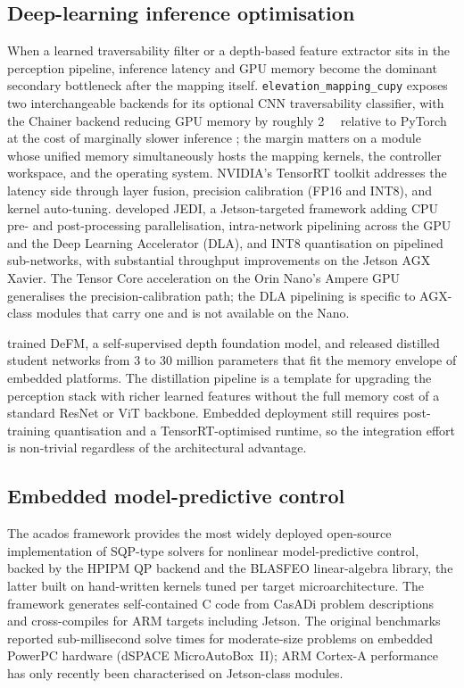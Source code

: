 \documentclass[11pt,a4paper]{article}
\begin{document}
\subsection{Deep-learning inference optimisation}
\label{sec:sq6:inference}

When a learned traversability filter or a depth-based feature extractor sits in the perception pipeline, inference latency and GPU memory become the dominant secondary bottleneck after the mapping itself. \texttt{elevation\_mapping\_cupy} exposes two interchangeable backends for its optional CNN traversability classifier, with the Chainer backend reducing GPU memory by roughly \SI{2}{\giga\byte} relative to PyTorch at the cost of marginally slower inference \citep{mikiElevationMappingLocomotion2022}; the margin matters on a module whose unified memory simultaneously hosts the mapping kernels, the controller workspace, and the operating system. NVIDIA's TensorRT toolkit addresses the latency side through layer fusion, precision calibration (FP16 and INT8), and kernel auto-tuning. \citet{jeong2022jedi} developed JEDI, a Jetson-targeted framework adding CPU pre- and post-processing parallelisation, intra-network pipelining across the GPU and the Deep Learning Accelerator (DLA), and INT8 quantisation on pipelined sub-networks, with substantial throughput improvements on the Jetson AGX Xavier. The Tensor Core acceleration on the Orin Nano's Ampere GPU generalises the precision-calibration path; the DLA pipelining is specific to AGX-class modules that carry one and is not available on the Nano.

\citet{patelDeFMLearningFoundation2026} trained DeFM, a self-supervised depth foundation model, and released distilled student networks from \num{3} to \num{30} million parameters that fit the memory envelope of embedded platforms. The distillation pipeline is a template for upgrading the perception stack with richer learned features without the full memory cost of a standard ResNet or ViT backbone. Embedded deployment still requires post-training quantisation and a TensorRT-optimised runtime, so the integration effort is non-trivial regardless of the architectural advantage.

\subsection{Embedded model-predictive control}
\label{sec:sq6:mpc}

The acados framework \citep{verschueren2022acados} provides the most widely deployed open-source implementation of SQP-type solvers for nonlinear model-predictive control, backed by the HPIPM QP backend and the BLASFEO \citep{frison2018blasfeo} linear-algebra library, the latter built on hand-written kernels tuned per target microarchitecture. The framework generates self-contained C code from CasADi problem descriptions and cross-compiles for ARM targets including Jetson. The original benchmarks reported sub-millisecond solve times for moderate-size problems on embedded PowerPC hardware (dSPACE MicroAutoBox~II); ARM Cortex-A performance has only recently been characterised on Jetson-class modules.
\end{document}
